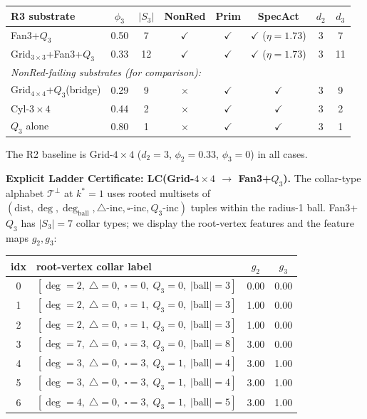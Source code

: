 \documentclass[11pt,a4paper]{article}
\theoremstyle{definition}
\theoremstyle{remark}
\begin{document}
\begin{center}
\begin{tabular}{lccccccc}
\toprule
\textbf{R3 substrate} & $\phi_3$ & $|S_3|$ & \textbf{NonRed} & \textbf{Prim} & \textbf{SpecAct} & $d_2$ & $d_3$ \\
\midrule
Fan3+$Q_3$ & 0.50 & 7 & $\checkmark$ & $\checkmark$ & $\checkmark$ ($\eta = 1.73$) & 3 & 7 \\
Grid$_{3\times3}$+Fan3+$Q_3$ & 0.33 & 12 & $\checkmark$ & $\checkmark$ & $\checkmark$ ($\eta = 1.73$) & 3 & 11 \\
\midrule
\multicolumn{8}{l}{\small\emph{NonRed-failing substrates (for comparison):}} \\
Grid$_{4\times4}$+$Q_3$(bridge) & 0.29 & 9 & $\times$ & $\checkmark$ & $\checkmark$ & 3 & 9 \\
Cyl-$3{\times}4$ & 0.44 & 2 & $\times$ & $\checkmark$ & $\checkmark$ & 3 & 2 \\
$Q_3$ alone & 0.80 & 1 & $\times$ & $\checkmark$ & $\checkmark$ & 3 & 1 \\
\bottomrule
\end{tabular}
\end{center}

The R2 baseline is Grid-$4{\times}4$ ($d_2 = 3$, $\phi_2 = 0.33$, $\phi_3 = 0$) in all cases.

\smallskip
\textbf{Explicit Ladder Certificate: LC(Grid-$4{\times}4$ $\to$ Fan3+$Q_3$).}
The collar-type alphabet $\mathcal{T}^\perp$ at $k^*\!=\!1$ uses rooted multisets of
$(\mathrm{dist},\deg,\deg_{\mathrm{ball}},\triangle\text{-inc},\square\text{-inc},Q_3\text{-inc})$ tuples
within the radius-1 ball.  Fan3+$Q_3$ has $|S_3| = 7$ collar types; we display the
root-vertex features and the feature maps $g_2,g_3$:

\begin{center}\small
\begin{tabular}{clcc}
\toprule
idx & root-vertex collar label & $g_2$ & $g_3$ \\
\midrule
0 & $[\deg\!=\!2,\;\triangle\!=\!0,\;\square\!=\!0,\;Q_3\!=\!0,\;|\text{ball}|\!=\!3]$ & 0.00 & 0.00 \\
1 & $[\deg\!=\!2,\;\triangle\!=\!0,\;\square\!=\!1,\;Q_3\!=\!0,\;|\text{ball}|\!=\!3]$ & 1.00 & 0.00 \\
2 & $[\deg\!=\!2,\;\triangle\!=\!0,\;\square\!=\!1,\;Q_3\!=\!0,\;|\text{ball}|\!=\!3]$ & 1.00 & 0.00 \\
3 & $[\deg\!=\!7,\;\triangle\!=\!0,\;\square\!=\!3,\;Q_3\!=\!0,\;|\text{ball}|\!=\!8]$ & 3.00 & 0.00 \\
4 & $[\deg\!=\!3,\;\triangle\!=\!0,\;\square\!=\!3,\;Q_3\!=\!1,\;|\text{ball}|\!=\!4]$ & 3.00 & 1.00 \\
5 & $[\deg\!=\!3,\;\triangle\!=\!0,\;\square\!=\!3,\;Q_3\!=\!1,\;|\text{ball}|\!=\!4]$ & 3.00 & 1.00 \\
6 & $[\deg\!=\!4,\;\triangle\!=\!0,\;\square\!=\!3,\;Q_3\!=\!1,\;|\text{ball}|\!=\!5]$ & 3.00 & 1.00 \\
\bottomrule
\end{tabular}
\end{center}
\end{document}
